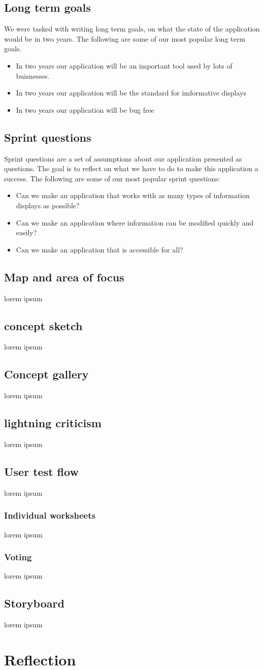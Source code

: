 \documentclass[12pt]{article}
\begin{document}
\subsection{Long term goals}
We were tasked with writing long term goals, on what the state of the application would be in two years.
The following are some of our most popular long term goals. 
\begin{itemize}
    \item In two years our application will be an important tool used by lots of buisnesses.
    \item In two years our application will be the standard for imformative displays
    \item In two years our application will be bug free
\end{itemize}
\subsection{Sprint questions}
Sprint questions are a set of assumptions about our application presented as questions.
The goal is to reflect on what we have to do to make this application a success.
The following are some of our most popular sprint questions:
\begin{itemize}
    \item Can we make an application that works with as many types of information displays as possible?
    \item Can we make an application where information can be modified quickly and easily?
    \item Can we make an application that is accessible for all?
\end{itemize}
\subsection{Map and area of focus}
lorem ipsum
\subsection{concept sketch}
lorem ipsum
\subsection{Concept gallery}
lorem ipsum
\subsection{lightning criticism}
lorem ipsum
\subsection{User test flow}
lorem ipsum
\subsubsection{Individual worksheets}
lorem ipsum
\subsubsection{Voting}
lorem ipsum
\subsection{Storyboard}
lorem ipsum

\section{Reflection}



\printbibliography
\end{document}
